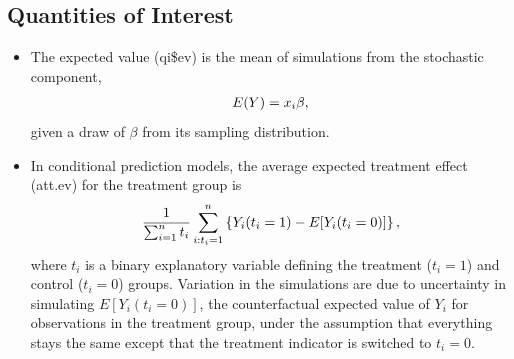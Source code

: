 \documentclass[letterpaper,10pt,english]{sphinxmanual}
\begin{document}
\subsection{Quantities of Interest}
\label{vignette:id22}\begin{itemize}
\item {} 
The expected value (qi\$ev) is the mean of simulations from the
stochastic component,
\begin{gather}
\begin{split}E(Y) = x_i \beta,\end{split}\notag
\end{gather}
given a draw of \(\beta\) from its sampling distribution.

\item {} 
In conditional prediction models, the average expected treatment
effect (att.ev) for the treatment group is
\begin{gather}
\begin{split}\frac{1}{\sum_{i=1}^n t_i}\sum_{i:t_i=1}^n \left\{ Y_i(t_i=1) -
      E[Y_i(t_i=0)] \right\},\end{split}\notag
\end{gather}
where \(t_i\) is a binary explanatory variable defining the
treatment (\(t_i=1\)) and control (\(t_i=0\)) groups.
Variation in the simulations are due to uncertainty in simulating
\(E[Y_i(t_i=0)]\), the counterfactual expected value of
\(Y_i\) for observations in the treatment group, under the
assumption that everything stays the same except that the treatment
indicator is switched to \(t_i=0\).

\end{itemize}
\end{document}
